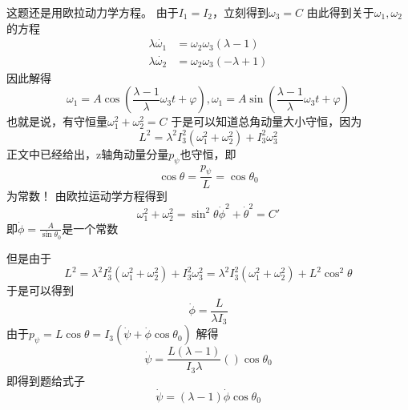\begin{solution}
    这题还是用欧拉动力学方程。
    由于$I_1=I_2$，立刻得到$\omega_3=C$
    由此得到关于$\omega_1,\omega_2$的方程
    \begin{align*}
        \lambda\dot{\omega_1}&=\omega_2\omega_3(\lambda-1)\\
        \lambda\dot{\omega_2}&=\omega_2\omega_3(-\lambda+1)
    \end{align*}
    因此解得
    $$\omega_1=A\cos(\frac{\lambda-1}{\lambda}\omega_3 t+\varphi),\omega_1=A\sin(\frac{\lambda-1}{\lambda}\omega_3 t+\varphi)$$
    也就是说，有守恒量$\omega_1^2+\omega_2^2=C$
    于是可以知道总角动量大小守恒，因为
    $$L^2=\lambda^2 I_3^2(\omega_1^2+\omega_2^2)+I_3^2\omega_3^2$$
    正文中已经给出，z轴角动量分量$p_\psi$也守恒，即
    $$\cos\theta=\frac{p_\psi}{L}=\cos\theta_0$$
    为常数！
    由欧拉运动学方程得到
    $$\omega_1^2+\omega_2^2=\sin^2\theta\dot\phi^2+\dot\theta^2=C'$$
    即$\dot\phi=\frac{A}{\sin\theta_0}$是一个常数
    
    但是由于$$L^2=\lambda^2I_3^2(\omega_1^2+\omega_2^2)+I_3^2\omega_3^2=\lambda^2 I_3^2(\omega_1^2+\omega_2^2)+L^2\cos^2\theta$$
    于是可以得到
    $$\dot\phi=\frac{L}{\lambda I_3}$$
    由于$p_\psi=L\cos\theta=I_3(\dot\psi+\dot\phi\cos\theta_0)$
    解得
    $$\dot\psi=\frac{L(\lambda-1)}{I_3\lambda}()\cos\theta_0$$
    即得到题给式子
    $$\dot\psi=(\lambda-1)\dot\phi\cos\theta_0$$
\end{solution}
